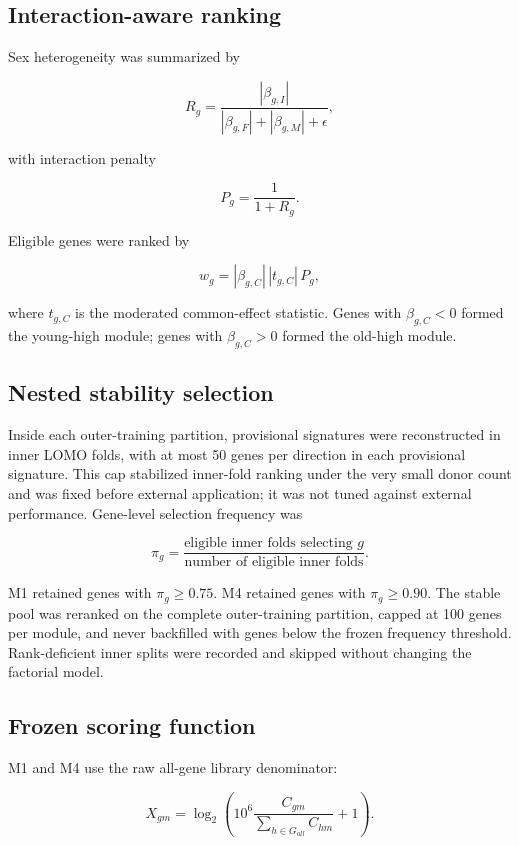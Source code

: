 \documentclass[10pt,twocolumn]{article}
\begin{document}
\subsection{Interaction-aware ranking}\label{interaction-aware-ranking}

Sex heterogeneity was summarized by

\[
R_g=\frac{|\beta_{g,I}|}{|\beta_{g,F}|+|\beta_{g,M}|+\epsilon},
\]

with interaction penalty

\[
P_g=\frac{1}{1+R_g}.
\]

Eligible genes were ranked by

\[
w_g=|\beta_{g,C}|\,|t_{g,C}|\,P_g,
\]

where \(t_{g,C}\) is the moderated common-effect statistic. Genes with \(\beta_{g,C}<0\) formed the young-high module; genes with \(\beta_{g,C}>0\) formed the old-high module.

\subsection{Nested stability selection}\label{nested-stability-selection}

Inside each outer-training partition, provisional signatures were reconstructed in inner LOMO folds, with at most 50 genes per direction in each provisional signature. This cap stabilized inner-fold ranking under the very small donor count and was fixed before external application; it was not tuned against external performance. Gene-level selection frequency was

\[
\pi_g=
\frac{\text{eligible inner folds selecting }g}
{\text{number of eligible inner folds}}.
\]

M1 retained genes with \(\pi_g\geq0.75\). M4 retained genes with \(\pi_g\geq0.90\). The stable pool was reranked on the complete outer-training partition, capped at 100 genes per module, and never backfilled with genes below the frozen frequency threshold. Rank-deficient inner splits were recorded and skipped without changing the factorial model.

\subsection{Frozen scoring function}\label{frozen-scoring-function}

M1 and M4 use the raw all-gene library denominator:

\[
X_{gm}=
\log_2\left(
10^6\frac{C_{gm}}{\sum_{h\in G_{all}}C_{hm}}+1
\right).
\]
\end{document}
